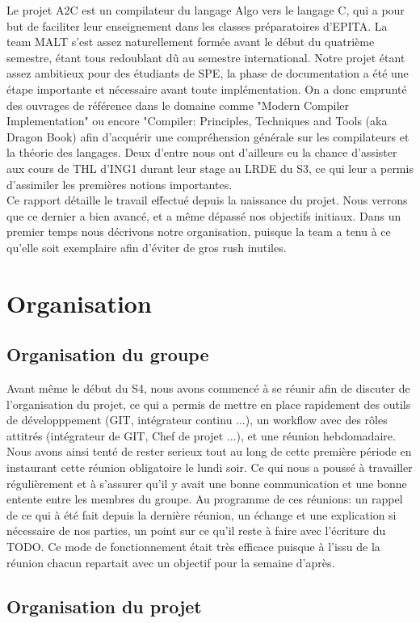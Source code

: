 \documentclass[12pt,a4paper]{report}
\newcommand{\mychapter}[2]{
    \setcounter{chapter}{#1}
    \setcounter{section}{0}
    \chapter*{#2}
    \addcontentsline{toc}{chapter}{#2}
}
\begin{document}
Le projet A2C est un compilateur du langage Algo vers le langage C, qui a pour but de faciliter leur enseignement dans les classes préparatoires d'EPITA.
La team MALT s'est assez naturellement formée avant le début du quatrième semestre, étant tous redoublant dû au semestre international. Notre projet étant assez ambitieux pour des étudiants de SPE, la phase de documentation a été une étape importante et nécessaire avant toute implémentation.
On a donc emprunté des ouvrages de référence dans le domaine comme "Modern Compiler Implementation" ou encore "Compiler: Principles, Techniques and Tools (aka Dragon Book) afin d'acquérir une compréhension générale sur les compilateurs et la théorie des langages. Deux d'entre nous ont d'ailleurs eu la chance d'assister aux cours de THL d'ING1 durant leur stage au LRDE du S3, ce qui leur a permis d'assimiler les premières notions importantes. \\

Ce rapport détaille le travail effectué depuis la naissance du projet. Nous verrons que ce dernier a bien avancé, et a même dépassé nos objectifs initiaux.
Dans un premier temps nous décrivons notre organisation, puisque la team a tenu à ce qu'elle soit exemplaire afin d'éviter de gros rush inutiles.

\mychapter{1}{Organisation}
\section{Organisation du groupe}
Avant même le début du S4, nous avons commencé à se réunir afin de discuter de l'organisation du projet, ce qui a permis de mettre en place rapidement des outils de développpement (GIT, intégrateur continu ...), un workflow avec des rôles attitrés (intégrateur de GIT, Chef de projet ...), et une réunion hebdomadaire.
Nous avons ainsi tenté de rester serieux tout au long de cette première période en instaurant cette réunion obligatoire le lundi soir. Ce qui nous a poussé à travailler régulièrement et à s'assurer qu'il y avait une bonne communication et une bonne entente entre les membres du groupe.
Au programme de ces réunions: un rappel de ce qui à été fait depuis la dernière réunion, un échange et une explication si nécessaire de nos parties, un point sur ce qu'il reste à faire avec l'écriture du TODO.
Ce mode de fonctionnement était très efficace puisque à l'issu de la réunion chacun repartait avec un objectif pour la semaine d'après.

\section{Organisation du projet}
\end{document}
